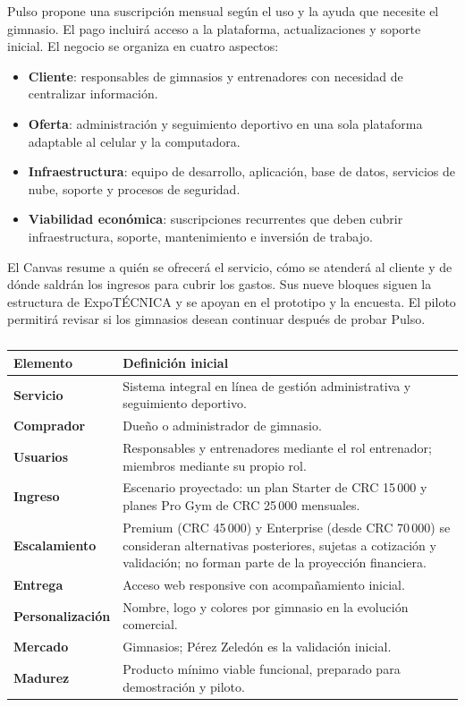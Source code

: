 Pulso propone una suscripción mensual según el uso y la ayuda que necesite el
gimnasio. El pago incluirá acceso a la plataforma, actualizaciones y soporte
inicial. El negocio se organiza en cuatro aspectos:

\begin{itemize}
  \item \textbf{Cliente}: responsables de gimnasios y entrenadores con necesidad
  de centralizar información.
  \item \textbf{Oferta}: administración y seguimiento deportivo en una sola
  plataforma adaptable al celular y la computadora.
  \item \textbf{Infraestructura}: equipo de desarrollo, aplicación, base de datos,
  servicios de nube, soporte y procesos de seguridad.
  \item \textbf{Viabilidad económica}: suscripciones recurrentes que deben cubrir
  infraestructura, soporte, mantenimiento e inversión de trabajo.
\end{itemize}

El Canvas resume a quién se ofrecerá el servicio, cómo se atenderá al cliente y
de dónde saldrán los ingresos para cubrir los gastos. Sus nueve bloques siguen
la estructura de ExpoTÉCNICA \parencite{mep2026} y se apoyan en el prototipo y
la encuesta. El piloto permitirá revisar si los gimnasios desean continuar
después de probar Pulso.

\begin{table}[htbp]
\caption{Resumen del modelo de negocio de Pulso}
\begin{tabularx}{\textwidth}{>{\bfseries}p{3.5cm}X}
\toprule
Elemento & Definición inicial \\
\midrule
Servicio & Sistema integral en línea de gestión administrativa y seguimiento deportivo. \\
Comprador & Dueño o administrador de gimnasio. \\
Usuarios & Responsables y entrenadores mediante el rol entrenador; miembros mediante su propio rol. \\
Ingreso & Escenario proyectado: un plan Starter de CRC 15\,000 y planes Pro Gym de CRC 25\,000 mensuales. \\
Escalamiento & Premium (CRC 45\,000) y Enterprise (desde CRC 70\,000) se consideran alternativas posteriores, sujetas a cotización y validación; no forman parte de la proyección financiera. \\
Entrega & Acceso web responsive con acompañamiento inicial. \\
Personalización & Nombre, logo y colores por gimnasio en la evolución comercial. \\
Mercado & Gimnasios; Pérez Zeledón es la validación inicial. \\
Madurez & Producto mínimo viable funcional, preparado para demostración y piloto. \\
\bottomrule
\end{tabularx}
\caption*{\fuentepropia}
\end{table}
